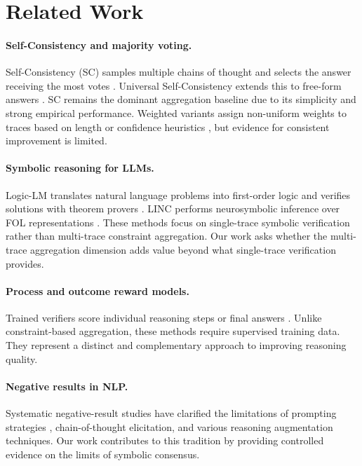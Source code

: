 \documentclass[11pt]{article}
\begin{document}
\section{Related Work}

\paragraph{Self-Consistency and majority voting.}
Self-Consistency (SC) samples multiple chains of thought and selects the answer receiving the most votes \citep{wang2023selfconsistency}.
Universal Self-Consistency extends this to free-form answers \citep{chen2023universal}.
SC remains the dominant aggregation baseline due to its simplicity and strong empirical performance.
Weighted variants assign non-uniform weights to traces based on length or confidence heuristics \citep{taubenfeld2024weighted}, but evidence for consistent improvement is limited.

\paragraph{Symbolic reasoning for LLMs.}
Logic-LM translates natural language problems into first-order logic and verifies solutions with theorem provers \citep{pan2023logiclm}.
LINC performs neurosymbolic inference over FOL representations \citep{olausson2023linc}.
These methods focus on single-trace symbolic verification rather than multi-trace constraint aggregation.
Our work asks whether the multi-trace aggregation dimension adds value beyond what single-trace verification provides.

\paragraph{Process and outcome reward models.}
Trained verifiers score individual reasoning steps or final answers \citep{cobbe2021gsm8k,lightman2023process}.
Unlike constraint-based aggregation, these methods require supervised training data.
They represent a distinct and complementary approach to improving reasoning quality.

\paragraph{Negative results in NLP.}
Systematic negative-result studies have clarified the limitations of prompting strategies \citep{reynolds2021prompt}, chain-of-thought elicitation, and various reasoning augmentation techniques.
Our work contributes to this tradition by providing controlled evidence on the limits of symbolic consensus.
\end{document}
